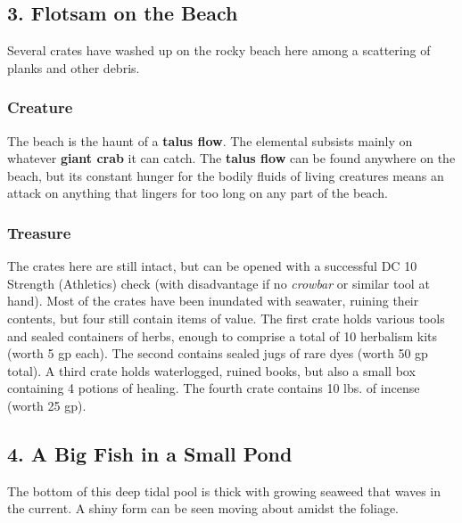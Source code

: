 \documentclass[10pt,a4paper,twoside,bg=print,twocolumn,openany,nodeprecatedcode]{dndbook}
\begin{document}
\subsection{3. Flotsam on the Beach}
\begin{DndReadAloud}{}
Several crates have washed up on the rocky beach here among a scattering of planks and other debris.

\end{DndReadAloud}

\subsubsection{Creature}
The beach is the haunt of a \textbf{talus flow}. The elemental subsists mainly on whatever \textbf{giant crab} it can catch. The \textbf{talus flow} can be found anywhere on the beach, but its constant hunger for the bodily fluids of living creatures means an attack on anything that lingers for too long on any part of the beach.

\subsubsection{Treasure}
The crates here are still intact, but can be opened with a successful DC 10 Strength (Athletics) check (with disadvantage if no \textit{crowbar} or similar tool at hand). Most of the crates have been inundated with seawater, ruining their contents, but four still contain items of value. The first crate holds various tools and sealed containers of herbs, enough to comprise a total of 10 herbalism kits (worth 5 gp each). The second contains sealed jugs of rare dyes (worth 50 gp total). A third crate holds waterlogged, ruined books, but also a small box containing 4 potions of healing. The fourth crate contains 10 lbs. of incense (worth 25 gp).

\subsection{4. A Big Fish in a Small Pond}
\begin{DndReadAloud}{}
The bottom of this deep tidal pool is thick with growing seaweed that waves in the current. A shiny form can be seen moving about amidst the foliage.

\end{DndReadAloud}
\end{document}

